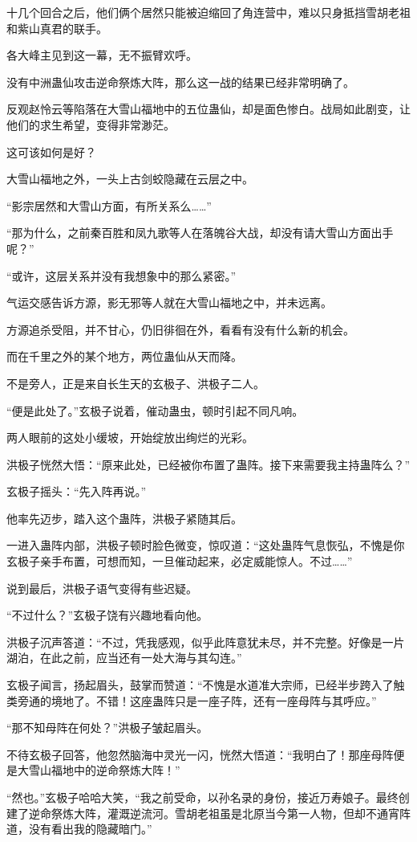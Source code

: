 \begin{this_body}
十几个回合之后，他们俩个居然只能被迫缩回了角连营中，难以只身抵挡雪胡老祖和紫山真君的联手。

各大峰主见到这一幕，无不振臂欢呼。

没有中洲蛊仙攻击逆命祭炼大阵，那么这一战的结果已经非常明确了。

反观赵怜云等陷落在大雪山福地中的五位蛊仙，却是面色惨白。战局如此剧变，让他们的求生希望，变得非常渺茫。

这可该如何是好？

大雪山福地之外，一头上古剑蛟隐藏在云层之中。

“影宗居然和大雪山方面，有所关系么……”

“那为什么，之前秦百胜和凤九歌等人在落魄谷大战，却没有请大雪山方面出手呢？”

“或许，这层关系并没有我想象中的那么紧密。”

气运交感告诉方源，影无邪等人就在大雪山福地之中，并未远离。

方源追杀受阻，并不甘心，仍旧徘徊在外，看看有没有什么新的机会。

而在千里之外的某个地方，两位蛊仙从天而降。

不是旁人，正是来自长生天的玄极子、洪极子二人。

“便是此处了。”玄极子说着，催动蛊虫，顿时引起不同凡响。

两人眼前的这处小缓坡，开始绽放出绚烂的光彩。

洪极子恍然大悟：“原来此处，已经被你布置了蛊阵。接下来需要我主持蛊阵么？”

玄极子摇头：“先入阵再说。”

他率先迈步，踏入这个蛊阵，洪极子紧随其后。

一进入蛊阵内部，洪极子顿时脸色微变，惊叹道：“这处蛊阵气息恢弘，不愧是你玄极子亲手布置，可想而知，一旦催动起来，必定威能惊人。不过……”

说到最后，洪极子语气变得有些迟疑。

“不过什么？”玄极子饶有兴趣地看向他。

洪极子沉声答道：“不过，凭我感观，似乎此阵意犹未尽，并不完整。好像是一片湖泊，在此之前，应当还有一处大海与其勾连。”

玄极子闻言，扬起眉头，鼓掌而赞道：“不愧是水道准大宗师，已经半步跨入了触类旁通的境地了。不错！这座蛊阵只是一座子阵，还有一座母阵与其呼应。”

“那不知母阵在何处？”洪极子皱起眉头。

不待玄极子回答，他忽然脑海中灵光一闪，恍然大悟道：“我明白了！那座母阵便是大雪山福地中的逆命祭炼大阵！”

“然也。”玄极子哈哈大笑，“我之前受命，以孙名录的身份，接近万寿娘子。最终创建了逆命祭炼大阵，灌溉逆流河。雪胡老祖虽是北原当今第一人物，但却不通宵阵道，没有看出我的隐藏暗门。”


\end{this_body}

